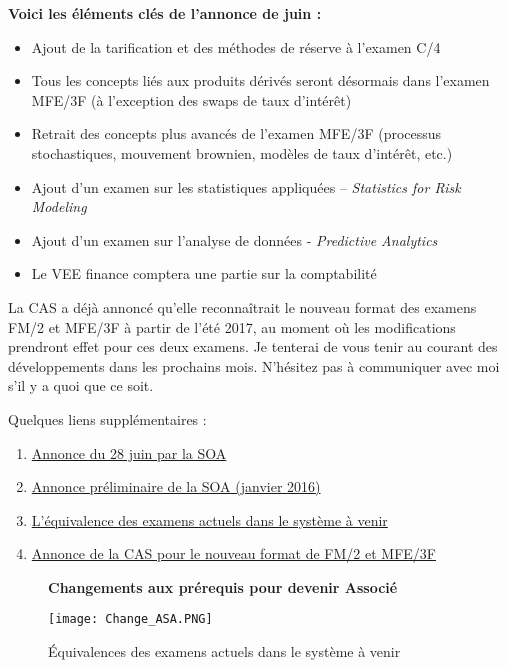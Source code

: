 \textbf{Voici les éléments clés de l’annonce de juin :}
\begin{itemize}
\item Ajout de la tarification et des méthodes de réserve à l’examen C/4
\item Tous les concepts liés aux produits dérivés seront désormais dans l'examen MFE/3F (à l'exception des swaps de taux d'intérêt)
\item Retrait des concepts plus avancés de l’examen MFE/3F (processus stochastiques, mouvement brownien, modèles de taux d’intérêt, etc.)
\item Ajout d’un examen sur les statistiques appliquées – \emph{Statistics for Risk Modeling}  
\item Ajout d’un examen sur l’analyse de données - \emph{Predictive Analytics}
\item Le VEE finance comptera une partie sur la comptabilité 
\end{itemize}
\vspace{\baselineskip} 

La CAS a déjà annoncé qu’elle reconnaîtrait le nouveau format des examens FM/2 et MFE/3F à partir de l’été 2017, au moment où les modifications prendront effet pour ces deux examens. Je tenterai de vous tenir au courant des développements dans les prochains mois. N’hésitez pas à communiquer avec moi s’il y a quoi que ce soit.\vspace{\baselineskip} 

Quelques liens supplémentaires :
\begin{enumerate}
\item \href{https://www.soa.org/Education/General-Info/2016-asa-cera-curriculum-changes.aspx}{Annonce du 28 juin par la SOA}
\item \href{https://soa.qualtrics.com/CP/File.php?F=F_0TDd9bj143TrCW9}{Annonce préliminaire de la SOA (janvier 2016)}
\item \href{https://www.soa.org/Education/General-Info/2016-transition-rules-asa-candidated.aspx}{L’équivalence des examens actuels dans le système à venir}
\item \href{http://www.casact.org/press/index.cfm?fa=viewArticle&articleID=3273}{Annonce de la CAS pour le nouveau format de FM/2 et MFE/3F}
\end{enumerate}

\begin{figure}[hp]
\begin{center}
\textbf{Changements aux prérequis pour devenir Associé}\par\medskip
\end{center}
\hfill\texttt{[image: Change\_ASA.PNG]}\hspace*{\fill}
\caption{Équivalences des examens actuels dans le système à venir}
\end{figure}
\par

\newpage